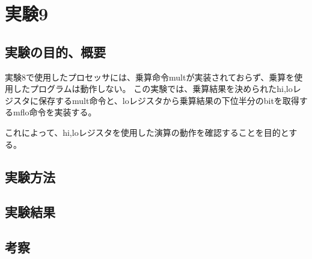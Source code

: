 \section{実験9}
\subsection{実験の目的、概要}
実験8で使用したプロセッサには、乗算命令multが実装されておらず、乗算を使用したプログラムは動作しない。
この実験では、乗算結果を決められたhi,loレジスタに保存するmult命令と、loレジスタから乗算結果の下位半分のbitを取得するmflo命令を実装する。

これによって、hi,loレジスタを使用した演算の動作を確認することを目的とする。

\subsection{実験方法}

\subsection{実験結果}

\subsection{考察}
